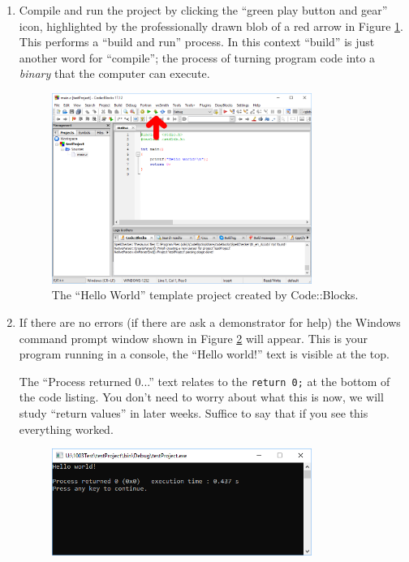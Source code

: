 \documentclass{lab}
\begin{document}
\begin{enumerate}
\item Compile and run the project by clicking the ``green play button and gear'' icon, highlighted by the professionally drawn blob of a red arrow in Figure \ref{fig:codeblocksTemplate}. This performs a ``build and run'' process. In this context ``build'' is just another word for ``compile''; the process of turning program code into a \textit{binary} that the computer can execute.

\begin{figure}[H]
\begin{center}
\includegraphics[width=0.8\textwidth]{Wk1Images/cb7}
\end{center}
\caption{The ``Hello World'' template project created by Code::Blocks.}
\label{fig:codeblocksTemplate}
\end{figure}

\item If there are no errors (if there are ask a demonstrator for help) the Windows command prompt window shown in Figure \ref{fig:cmdcom} will appear. This is your program running in a console, the ``Hello world!'' text is visible at the top.

The ``Process returned 0...'' text relates to the \texttt{return 0;} at the bottom of the code listing. You don't need to worry about what this is now, we will study ``return values'' in later weeks. Suffice to say that if you see this everything worked.

\begin{figure}[H]
\begin{center}
\includegraphics[width=0.8\textwidth]{Wk1Images/cb8}
\end{center}
\caption{}
\label{fig:cmdcom}
\end{figure}

\end{enumerate}
\end{document}

